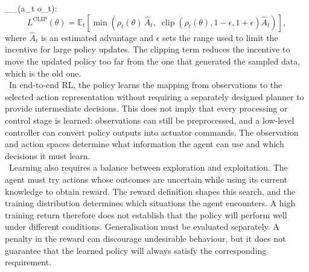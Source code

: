 \pi_{\theta_{}}(a_t \mid o_t)\):
%
\begin{equation}
    L^{\mathrm{CLIP}}(\theta) =
    \mathbb{E}_t
    \left[
        \min\!\left(
            \rho_t(\theta)\,\hat{A}_t,\;
            \operatorname{clip}\!\left(\rho_t(\theta), 1-\epsilon, 1+\epsilon
            \right)\hat{A}_t
        \right)
    \right],
    \label{eq:ppo_clip}
\end{equation}
%
where \(\hat{A}_t\) is an estimated advantage and \(\epsilon\) sets the
range used to limit the incentive for large policy updates. The clipping term
reduces the incentive to move the updated policy too far from the one that
generated the sampled data, which is the old one.\\
\
In end-to-end RL, the policy learns the mapping from observations to the
selected action representation without requiring a separately designed planner
to provide intermediate decisions. This does not imply that every processing
or control stage is learned: observations can still be preprocessed, and a
low-level controller can convert policy outputs into actuator commands. The
observation and action spaces determine what information the agent can use and
which decisions it must learn.\\
\
Learning also requires a balance between exploration and exploitation. The
agent must try actions whose outcomes are uncertain while using its current
knowledge to obtain reward. The reward definition shapes this search, and the
training distribution determines which situations the agent encounters. A high
training return therefore does not establish that the policy will perform well
under different conditions. Generalisation must be evaluated separately. A
penalty in the reward can discourage undesirable behaviour, but it does not
guarantee that the learned policy will always satisfy the corresponding
requirement.

